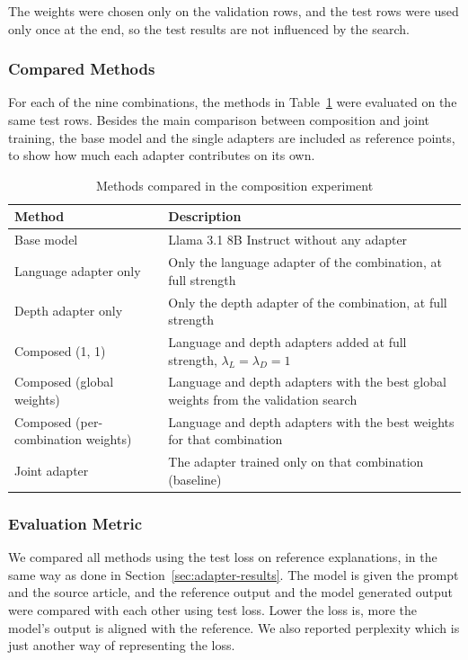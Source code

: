 \documentclass{FastFyp}
\begin{document}
The weights were chosen only on the validation rows, and the test rows were used only once at the end, so the test results are not influenced by the search.

\subsubsection{Compared Methods}
For each of the nine combinations, the methods in Table~\ref{tab:comp-methods} were evaluated on the same test rows. Besides the main comparison between composition and joint training, the base model and the single adapters are included as reference points, to show how much each adapter contributes on its own.

\begin{table}[H]
\centering
\caption{Methods compared in the composition experiment}
\label{tab:comp-methods}
\small
\begin{tabular}{|p{}|p{}|}
\hline
\textbf{Method} & \textbf{Description} \\ \hline
Base model & Llama 3.1 8B Instruct without any adapter \\ \hline
Language adapter only & Only the language adapter of the combination, at full strength \\ \hline
Depth adapter only & Only the depth adapter of the combination, at full strength \\ \hline
Composed (1, 1) & Language and depth adapters added at full strength, $\lambda_L = \lambda_D = 1$ \\ \hline
Composed (global weights) & Language and depth adapters with the best global weights from the validation search \\ \hline
Composed (per-combination weights) & Language and depth adapters with the best weights for that combination \\ \hline
Joint adapter & The adapter trained only on that combination (baseline) \\ \hline
\end{tabular}
\end{table}

\subsubsection{Evaluation Metric}
We compared all methods using the test loss on reference explanations, in the same way as done in Section~\ref{sec:adapter-results}. The model is given the prompt and the source article, and the reference output and the model generated output were compared with each other using test loss. Lower the loss is, more the model's output is aligned with the reference. We also reported perplexity which is just another way of representing the loss.
\end{document}
